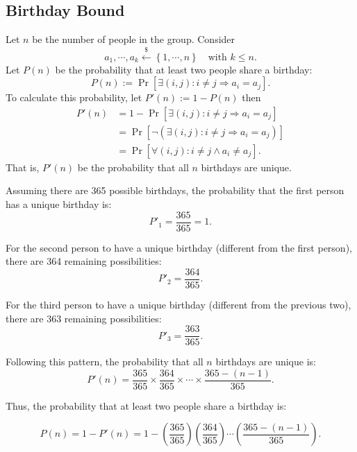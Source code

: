 \documentclass[12pt,openany]{book}
\theoremstyle{definition}
\newcommand{\set}[1]{\left\{#1\right\}}
\newcommand{\of}[1]{\left( #1 \right)}
\newcommand{\dollar}{\$}
\newcommand{\uniform}{\xleftarrow{\dollar}}
\begin{document}
	\subsection{Birthday Bound}
	Let $n$ be the number of people in the group. Consider \[
	a_1,\cdots,a_k\uniform\set{1,\cdots, n}\quad\text{with $k\leq n$}.
	\] Let $P(n)$ be the probability that at least two people share a birthday: \[
	P\of{n}:=\Pr\left[\exists (i,j):i\neq j\Rightarrow a_i=a_j\right].
	\] To calculate this probability, let $P'\of{n}:=1-P\of{n}$ then \begin{align*}
		P'\of{n}&=1-\Pr\left[\exists (i,j):i\neq j\Rightarrow a_i=a_j\right]\\
		&=\Pr\left[\lnot\of{\exists (i,j):i\neq j\Rightarrow a_i=a_j}\right]\\
		&=\Pr\left[\forall(i,j):i\neq j\land a_i\neq a_j\right].
	\end{align*}
	That is, $P' (n)$ be the probability that all $n$ birthdays are unique.
	
	Assuming there are 365 possible birthdays, the probability that the first person has a unique birthday is:
	\begin{equation*}
		P'_1 = \frac{365}{365} = 1.
	\end{equation*}
	
	For the second person to have a unique birthday (different from the first person), there are 364 remaining possibilities:
	\begin{equation*}
		P'_2 = \frac{364}{365}.
	\end{equation*}
	
	For the third person to have a unique birthday (different from the previous two), there are 363 remaining possibilities:
	\begin{equation*}
		P'_3 = \frac{363}{365}.
	\end{equation*}
	
	Following this pattern, the probability that all $n$ birthdays are unique is:
	\begin{equation*}
		P'(n) = \frac{365}{365} \times \frac{364}{365} \times \cdots \times \frac{365 - (n - 1)}{365}.
	\end{equation*}
	
	Thus, the probability that at least two people share a birthday is:
	
	\begin{equation*}
		P(n) = 1 - P'(n)=1-\of{\frac{365}{365}}\of{\frac{364}{365}}\cdots\of{\frac{365-(n-1)}{365}}.
	\end{equation*}
\end{document}
